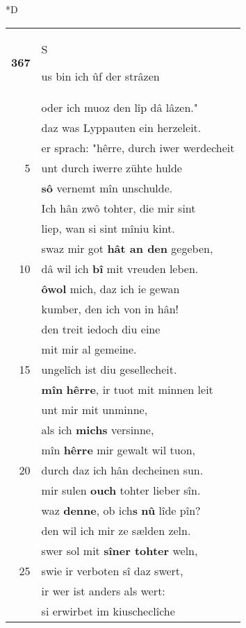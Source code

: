 \documentclass[8pt,a4paper,notitlepage]{article}
\begin{document}
\begin{table}[ht]
\begin{minipage}[t]{0.5\linewidth}
\small
\begin{center}*D
\end{center}
\begin{tabular}{rl}
\textbf{367} & \begin{large}S\end{large}us bin ich ûf der strâzen\\ 
 & oder ich muoz den lîp dâ lâzen."\\ 
 & daz was Lyppauten ein herzeleit.\\ 
 & er sprach: "hêrre, durch iwer werdecheit\\ 
5 & unt durch iwerre zühte hulde\\ 
 & \textbf{sô} vernemt mîn unschulde.\\ 
 & Ich hân zwô tohter, die mir sint\\ 
 & liep, wan si sint mîniu kint.\\ 
 & swaz mir got \textbf{hât an den} gegeben,\\ 
10 & dâ wil ich \textbf{bî} mit vreuden leben.\\ 
 & \textbf{ôwol} mich, daz ich ie gewan\\ 
 & kumber, den ich von in hân!\\ 
 & den treit iedoch diu eine\\ 
 & mit mir al gemeine.\\ 
15 & ungelîch ist diu gesellecheit.\\ 
 & \textbf{mîn} \textbf{hêrre}, ir tuot mit minnen leit\\ 
 & unt mir mit unminne,\\ 
 & als ich \textbf{michs} versinne,\\ 
 & mîn \textbf{hêrre} mir gewalt wil tuon,\\ 
20 & durch daz ich hân decheinen sun.\\ 
 & mir sulen \textbf{ouch} tohter lieber sîn.\\ 
 & waz \textbf{denne}, ob ich\textbf{s} \textbf{nû} lîde pîn?\\ 
 & den wil ich mir ze sælden zeln.\\ 
 & swer sol mit \textbf{sîner tohter} weln,\\ 
25 & swie ir verboten sî daz swert,\\ 
 & ir wer ist anders als wert:\\ 
 & si erwirbet im kiuscheclîche\\ 

\end{tabular}
\end{minipage}
\end{table}
\end{document}
